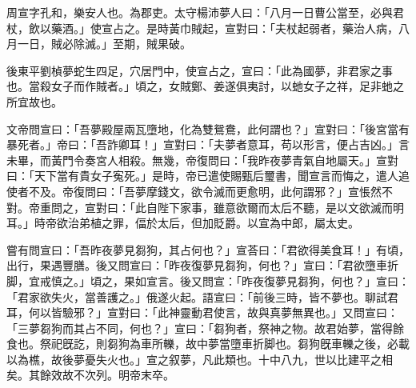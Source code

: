 
\begin{pinyinscope}
周宣字孔和，樂安人也。為郡吏。太守楊沛夢人曰：「八月一日曹公當至，必與君杖，飲以藥酒。」使宣占之。是時黃巾賊起，宣對曰：「夫杖起弱者，藥治人病，八月一日，賊必除滅。」至期，賊果破。

後東平劉楨夢蛇生四足，穴居門中，使宣占之，宣曰：「此為國夢，非君家之事也。當殺女子而作賊者。」頃之，女賊鄭、姜遂俱夷討，以虵女子之祥，足非虵之所宜故也。

文帝問宣曰：「吾夢殿屋兩瓦墮地，化為雙鴛鴦，此何謂也？」宣對曰：「後宮當有暴死者。」帝曰：「吾詐卿耳！」宣對曰：「夫夢者意耳，苟以形言，便占吉凶。」言未畢，而黃門令奏宮人相殺。無幾，帝復問曰：「我昨夜夢青氣自地屬天。」宣對曰：「天下當有貴女子寃死。」是時，帝已遣使賜甄后璽書，聞宣言而悔之，遣人追使者不及。帝復問曰：「吾夢摩錢文，欲令滅而更愈明，此何謂邪？」宣悵然不對。帝重問之，宣對曰：「此自陛下家事，雖意欲爾而太后不聽，是以文欲滅而明耳。」時帝欲治弟植之罪，偪於太后，但加貶爵。以宣為中郎，屬太史。

嘗有問宣曰：「吾昨夜夢見芻狗，其占何也？」宣荅曰：「君欲得美食耳！」有頃，出行，果遇豐膳。後又問宣曰：「昨夜復夢見芻狗，何也？」宣曰：「君欲墮車折脚，宜戒慎之。」頃之，果如宣言。後又問宣：「昨夜復夢見芻狗，何也？」宣曰：「君家欲失火，當善護之。」俄遂火起。語宣曰：「前後三時，皆不夢也。聊試君耳，何以皆驗邪？」宣對曰：「此神靈動君使言，故與真夢無異也。」又問宣曰：「三夢芻狗而其占不同，何也？」宣曰：「芻狗者，祭神之物。故君始夢，當得餘食也。祭祀旣訖，則芻狗為車所轢，故中夢當墮車折脚也。芻狗旣車轢之後，必載以為樵，故後夢憂失火也。」宣之叙夢，凡此類也。十中八九，世以比建平之相矣。其餘效故不次列。明帝末卒。


\end{pinyinscope}